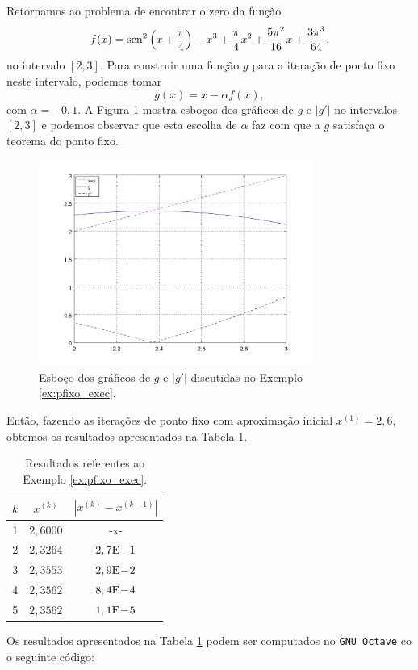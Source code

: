 \begin{ex}\label{ex:pfixo_exec}
  Retornamos ao problema de encontrar o zero da função
  \begin{equation}
    f(x) = \operatorname{sen}^2\left(x+\frac{\pi}{4}\right) - x^3 + \frac{\pi}{4}x^2 + \frac{5\pi^2}{16}x + \frac{3\pi^3}{64}.
  \end{equation}
  no intervalo $[2,3]$. Para construir uma função $g$ para a iteração de ponto fixo neste intervalo, podemos tomar
  \begin{equation}
    g(x) = x - \alpha f(x),
  \end{equation}
com $\alpha = -0,1$. A Figura \ref{fig:ex_pfixo_exec} mostra esboços dos gráficos de $g$ e $|g'|$ no intervalos $[2, 3]$ e podemos observar que esta escolha de $\alpha$ faz com que a $g$ satisfaça o teorema do ponto fixo.

\begin{figure}[h!]
  \centering
  \includegraphics[width=0.8\textwidth]{./cap_eq1d/dados/ex_pfixo_exec/fig_ex_pfixo_exec}
  \caption{Esboço dos gráficos de $g$ e $|g'|$ discutidas no Exemplo \ref{ex:pfixo_exec}.}
  \label{fig:ex_pfixo_exec}
\end{figure}

Então, fazendo as iterações de ponto fixo com aproximação inicial $x^{(1)}=2,6$, obtemos os resultados apresentados na Tabela \ref{tab:ex_pfixo_exec}.

\begin{table}[h!]
  \centering
  \begin{tabular}{r|cc}
    $k$ & $x^{(k)}$ & $|x^{(k)}-x^{(k-1)}|$ \\\hline
    1 & $2,6000$ & -x-\\
    2 & $2,3264$ & $2,7\mathrm{E}\!-\!1$ \\
    3 & $2,3553$ & $2,9\mathrm{E}\!-\!2$ \\
    4 & $2,3562$ & $8,4\mathrm{E}\!-\!4$ \\
    5 & $2,3562$ & $1,1\mathrm{E}\!-\!5$ \\\hline
  \end{tabular}
  \caption{Resultados referentes ao Exemplo \ref{ex:pfixo_exec}.}
  \label{tab:ex_pfixo_exec}
\end{table}

\ifisoctave
Os resultados apresentados na Tabela \ref{tab:ex_pfixo_exec} podem ser computados no \verb+GNU Octave+ co o seguinte código:

\fi
\end{ex}

